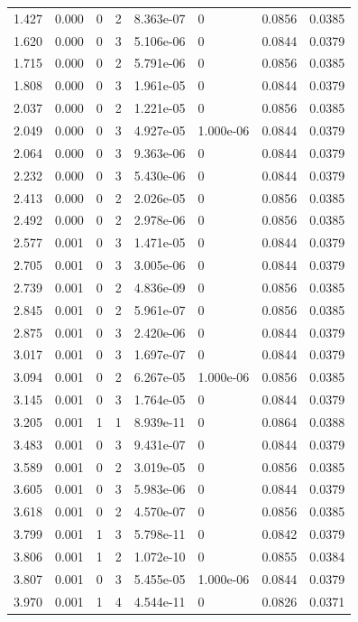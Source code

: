 \documentclass[preview]{standalone}
\begin{document}
{{\begin{tabular}{L{1.2cm}C{1.2cm} C{0.3cm}C{0.5cm} C{1.4cm}C{1.4cm} C{1.4cm}C{1.4cm}}
  1.427  &  0.000  & 0     &  2 &  8.363e-07  & 0  & 0.0856 &  0.0385   \\ 
  1.620  &  0.000  & 0     &  3 &  5.106e-06  & 0  & 0.0844 &  0.0379   \\ 
  1.715  &  0.000  & 0     &  2 &  5.791e-06  & 0  & 0.0856 &  0.0385   \\ 
  1.808  &  0.000  & 0     &  3 &  1.961e-05  & 0  & 0.0844 &  0.0379   \\ 
  2.037  &  0.000  & 0     &  2 &  1.221e-05  & 0  & 0.0856 &  0.0385   \\ 
  2.049  &  0.000  & 0     &  3 &  4.927e-05  & 1.000e-06  & 0.0844 &  0.0379   \\ 
  2.064  &  0.000  & 0     &  3 &  9.363e-06  & 0  & 0.0844 &  0.0379   \\ 
  2.232  &  0.000  & 0     &  3 &  5.430e-06  & 0  & 0.0844 &  0.0379   \\ 
  2.413  &  0.000  & 0     &  2 &  2.026e-05  & 0  & 0.0856 &  0.0385   \\ 
  2.492  &  0.000  & 0     &  2 &  2.978e-06  & 0  & 0.0856 &  0.0385   \\ 
  2.577  &  0.001  & 0     &  3 &  1.471e-05  & 0  & 0.0844 &  0.0379   \\ 
  2.705  &  0.001  & 0     &  3 &  3.005e-06  & 0  & 0.0844 &  0.0379   \\ 
  2.739  &  0.001  & 0     &  2 &  4.836e-09  & 0  & 0.0856 &  0.0385   \\ 
  2.845  &  0.001  & 0     &  2 &  5.961e-07  & 0  & 0.0856 &  0.0385   \\ 
  2.875  &  0.001  & 0     &  3 &  2.420e-06  & 0  & 0.0844 &  0.0379   \\ 
  3.017  &  0.001  & 0     &  3 &  1.697e-07  & 0  & 0.0844 &  0.0379   \\ 
  3.094  &  0.001  & 0     &  2 &  6.267e-05  & 1.000e-06  & 0.0856 &  0.0385   \\ 
  3.145  &  0.001  & 0     &  3 &  1.764e-05  & 0  & 0.0844 &  0.0379   \\ 
  3.205  &  0.001  & 1     &  1 &  8.939e-11  & 0  & 0.0864 &  0.0388   \\ 
  3.483  &  0.001  & 0     &  3 &  9.431e-07  & 0  & 0.0844 &  0.0379   \\ 
  3.589  &  0.001  & 0     &  2 &  3.019e-05  & 0  & 0.0856 &  0.0385   \\ 
  3.605  &  0.001  & 0     &  3 &  5.983e-06  & 0  & 0.0844 &  0.0379   \\ 
  3.618  &  0.001  & 0     &  2 &  4.570e-07  & 0  & 0.0856 &  0.0385   \\ 
  3.799  &  0.001  & 1     &  3 &  5.798e-11  & 0  & 0.0842 &  0.0379   \\ 
  3.806  &  0.001  & 1     &  2 &  1.072e-10  & 0  & 0.0855 &  0.0384   \\ 
  3.807  &  0.001  & 0     &  3 &  5.455e-05  & 1.000e-06  & 0.0844 &  0.0379   \\ 
  3.970  &  0.001  & 1     &  4 &  4.544e-11  & 0  & 0.0826 &  0.0371   \\ 
\hline 
\end{tabular} 

}}
\end{document}
